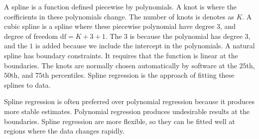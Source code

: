 \noindent A spline is a function defined piecewise by polynomials. A knot is where the coefficients in these polynomials change. The number of knots is denotes as $K$. A cubic spline is a spline where these piecewise polynomial have degree $3$, and degree of freedom $\text{df} = K + 3 + 1$. The $3$ is because the polynomial has degree $3$, and the $1$ is added because we include the intercept in the polynomials. A natural spline has boundary constraints. It requires that the function is linear at the boundaries. The knots are normally chosen automatically by software at the $25$th, $50$th, and $75$th percentiles. Spline regression is the approach of fitting these splines to data. \cite[p.~295--300]{intro_stat_learning}

Spline regression is often preferred over polynomial regression because it produces more stable estimates. Polynomial regression produces undesirable results at the boundaries. Spline regression are more flexible, so they can be fitted well at regions where the data changes rapidly. \cite[p.~300]{intro_stat_learning}